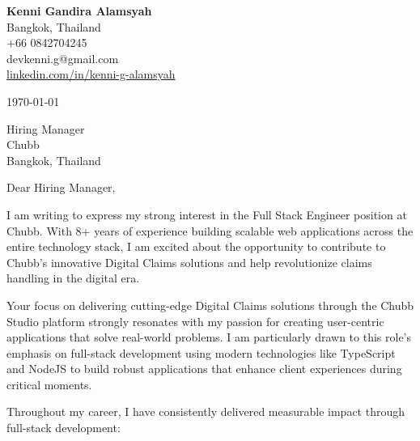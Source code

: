 \documentclass[11pt]{article}
\begin{document}
\begin{flushleft}
\textbf{Kenni Gandira Alamsyah} \\
Bangkok, Thailand \\
+66 0842704245 \\
devkenni.g@gmail.com \\
\href{https://www.linkedin.com/in/kenni-g-alamsyah}{linkedin.com/in/kenni-g-alamsyah}
\end{flushleft}

\vspace{1em}

\today

\vspace{1em}

\begin{flushleft}
Hiring Manager \\
Chubb \\
Bangkok, Thailand
\end{flushleft}

\vspace{1em}

Dear Hiring Manager,

\vspace{0.5em}

I am writing to express my strong interest in the Full Stack Engineer position at Chubb. With 8+ years of experience building scalable web applications across the entire technology stack, I am excited about the opportunity to contribute to Chubb's innovative Digital Claims solutions and help revolutionize claims handling in the digital era.

\vspace{0.5em}

Your focus on delivering cutting-edge Digital Claims solutions through the Chubb Studio platform strongly resonates with my passion for creating user-centric applications that solve real-world problems. I am particularly drawn to this role's emphasis on full-stack development using modern technologies like TypeScript and NodeJS to build robust applications that enhance client experiences during critical moments.

\vspace{0.5em}

Throughout my career, I have consistently delivered measurable impact through full-stack development:

\vspace{0.3em}
\end{document}
